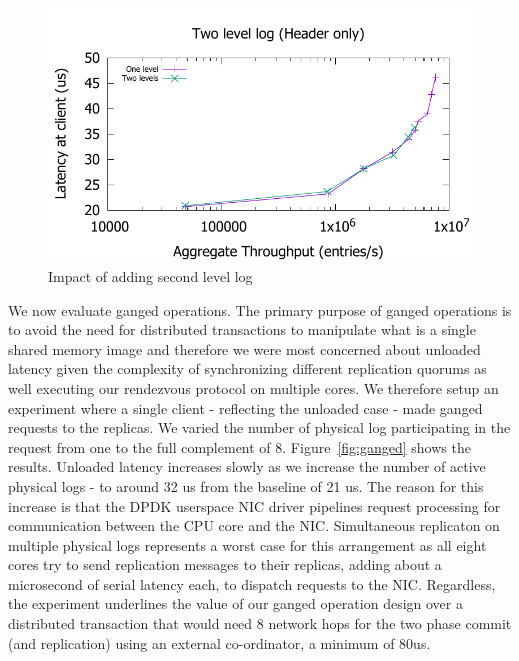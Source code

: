 \documentclass[pageno]{jpaper}
\begin{document}
\begin{figure}
\includegraphics[scale=0.6]{results2/flashlog.pdf}
\caption{Impact of adding second level log}
\label{fig:flashlog}
\end{figure}

We now evaluate ganged operations. The primary purpose of
ganged operations is to avoid the need for distributed transactions to
manipulate what is a single shared memory image and therefore we were most
concerned about unloaded latency given the complexity of synchronizing different
replication quorums as well executing our rendezvous protocol on multiple
cores. We therefore setup an experiment where a single client - reflecting the
unloaded case - made ganged requests to the replicas. We varied the number of
physical log participating in the request from one to the full complement of 8.
Figure~\ref{fig:ganged} shows the results. Unloaded
latency increases slowly as we increase the number of active physical logs - to
around 32 us from the baseline of 21 us. The reason for this increase is that
the DPDK userspace NIC driver pipelines request processing for communication
between the CPU core and the NIC. Simultaneous replicaton on multiple physical
logs represents a worst case for this arrangement as all eight cores try to
send replication messages to their replicas, adding about a microsecond of
serial latency each, to dispatch requests to the NIC. Regardless, the experiment
underlines the value of our ganged operation design over a distributed
transaction that would need 8 network hops for the two phase commit (and
replication) using an external co-ordinator, a minimum of 80us.
\end{document}

